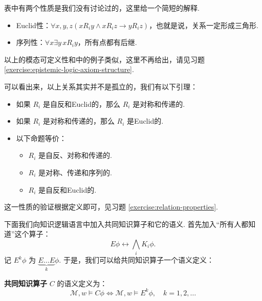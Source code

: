 表中有两个性质是我们没有讨论过的，这里给一个简短的解释. 
\begin{itemize}
    \item Euclid性：$\forall x,y,z(xR_iy\wedge xR_iz\to yR_iz)$，也就是说，关系一定形成三角形. 
    \item 序列性：$\forall x\exists y\, xR_iy$，所有点都有后继. 
\end{itemize}

以上的模态可定义性和中的例子类似，这里不再给出，请见习题 \ref{exercise:epistemic-logic-axiom-structure}.

可以看出来，以上关系其实并不是孤立的，我们有以下引理：

\begin{lemma}\label{lemma:relation-properties}
\begin{itemize}
    \item 如果 $R_i$ 是自反和Euclid的，那么 $R_i$ 是对称和传递的.
    \item 如果 $R_i$ 是对称和传递的，那么 $R_i$ 是Euclid的.
    \item 以下命题等价：
    \begin{itemize}
        \item $R_i$ 是自反、对称和传递的.
        \item $R_i$ 是对称、传递和序列的.
        \item $R_i$ 是自反和Euclid的.
    \end{itemize}
\end{itemize}
\end{lemma}

这一性质的验证根据定义即可，见习题 \ref{exercise:relation-properties}.

下面我们向知识逻辑语言中加入共同知识算子和它的语义. 首先加入“所有人都知道”这个算子：
\[E\phi\leftrightarrow\bigwedge_i K_i\phi.\]
记 $E^k\phi$ 为 $\underbrace{E\dots E}_k\phi$. 于是，我们可以给共同知识算子一个语义定义：

\begin{definition}[共同知识算子]
\textbf{共同知识算子} $C$ 的语义定义为：
\[
\mathcal M,w\vDash C\phi\iff\mathcal M,w\vDash E^k\phi,\quad k=1,2,\dots
\]
\end{definition}

